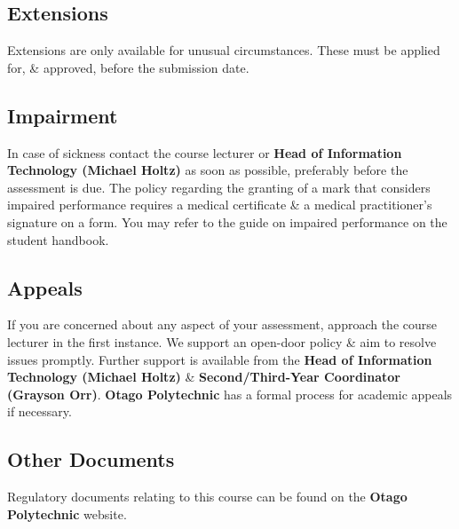 \documentclass{article}
\begin{document}
\subsection*{Extensions}
Extensions are only available for unusual circumstances. These must be applied for, \& approved, before the submission date.

\subsection*{Impairment}
In case of sickness contact the course lecturer or \textbf{Head of Information Technology (Michael Holtz)} as soon as possible, preferably before the assessment is due. The policy regarding the granting of a mark that considers impaired performance requires a medical certificate \& a medical practitioner’s signature on a form. You may refer to the guide on impaired performance on the student handbook.

\subsection*{Appeals}
If you are concerned about any aspect of your assessment, approach the course lecturer in the first instance. We support an open-door policy \& aim to resolve issues promptly. Further support is available from the \textbf{Head of Information Technology (Michael Holtz)} \& \textbf{Second/Third-Year Coordinator (Grayson Orr)}. \textbf{Otago Polytechnic} has a formal process for academic appeals if necessary.

\subsection*{Other Documents}
Regulatory documents relating to this course can be found on the \textbf{Otago Polytechnic} website.
\end{document}
